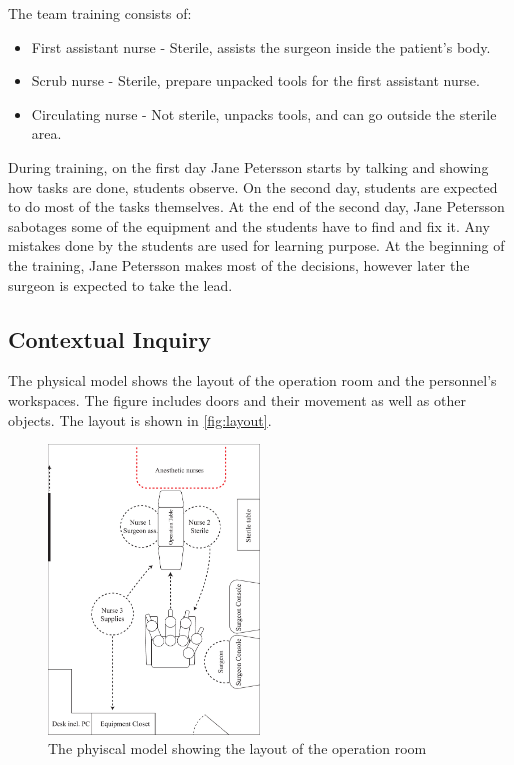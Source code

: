 The team training consists of:
\begin{itemize}
  \item First assistant nurse - Sterile, assists the surgeon inside the patient's body.
  \item Scrub nurse - Sterile, prepare unpacked tools for the first assistant nurse.
  \item Circulating nurse - Not sterile, unpacks tools, and can go outside the sterile area.
\end{itemize}  

During training, on the first day Jane Petersson starts by talking and showing how tasks are done, students observe. On the second day, students are expected to do most of the tasks themselves. At the end of the second day, Jane Petersson sabotages some of the equipment and the students have to find and fix it. Any mistakes done by the students are used for learning purpose. At the beginning of the training, Jane Petersson makes most of the decisions, however later the surgeon is expected to take the lead.

\subsection*{Contextual Inquiry}
The physical model shows the layout of the operation room and the personnel's workspaces. The figure includes doors and their movement as well as other objects. The layout is shown in \autoref{fig:layout}.

\begin{figure}[hpbt]
	\centering
	\includegraphics[width=0.5\textwidth]{FieldStudies/figures/physical}
	\caption{The phyiscal model showing the layout of the operation room}
	\label{fig:layout}
\end{figure}

